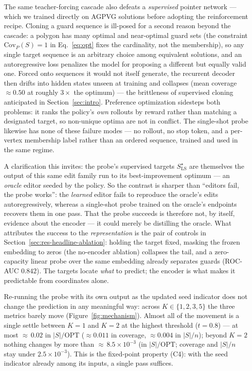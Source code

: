 \documentclass[preprint,10pt]{elsarticle}
\newcommand{\Covf}[1]{\mathrm{Cov}_P(#1)}
\newcommand{\OPT}{\mathrm{OPT}}
\begin{document}
The same teacher-forcing cascade also defeats a \emph{supervised} pointer network --- which we trained directly on AGPVG solutions before adopting the reinforcement recipe. Cloning a guard sequence is ill-posed for a second reason beyond the cascade: a polygon has many optimal and near-optimal guard sets (the constraint $\Covf{S}=1$ in Eq.~\eqref{eq:opt} fixes the cardinality, not the membership), so any single target sequence is an arbitrary choice among equivalent solutions, and an autoregressive loss penalizes the model for proposing a different but equally valid one. Forced onto sequences it would not itself generate, the recurrent decoder then drifts into hidden states unseen at training and collapses (mean coverage $\approx 0.50$ at roughly $3\times$ the optimum) --- the brittleness of supervised cloning anticipated in Section~\ref{sec:intro}. Preference optimization sidesteps both problems: it ranks the policy's \emph{own} rollouts by reward rather than matching a designated target, so non-unique optima are not in conflict. The single-shot probe likewise has none of these failure modes --- no rollout, no stop token, and a per-vertex membership label rather than an ordered sequence, trained and used in the same regime.

A clarification this invites: the probe's supervised targets $S^\star_{\mathrm{LS}}$ are themselves the output of this same edit family run to its best-improvement optimum --- an \emph{oracle} editor seeded by the policy. So the contrast is sharper than ``editors fail, the probe works'': the \emph{learned} editor fails to reproduce the oracle's edits autoregressively, whereas a single-shot probe trained on the oracle's endpoints recovers them in one pass. That the probe succeeds is therefore not, by itself, evidence about the encoder --- it could merely be distilling the oracle. What attributes the success to the \emph{representation} is the pair of controls in Section~\ref{sec:res-headline-ablation}: holding the target fixed, masking the frozen embedding to zeros (the no-encoder ablation) collapses the tail, and a zero-capacity linear probe over the same embedding already separates guards (ROC-AUC $0.842$). The targets locate \emph{what} to predict; the encoder is what makes it predictable from coordinates alone.

Re-running the probe with its own output as the updated seed indicator does not change the prediction in any meaningful way: across $K \in \{1, 2, 3, 5\}$ the three metrics barely move (Figure~\ref{fig:mechanism}). Almost all of the movement is a single settle between $K = 1$ and $K = 2$ at the highest threshold ($t = 0.8$) --- at most ${\approx}\,0.02$ in $|S|/\OPT$ ($\approx 0.011$ in coverage, $\approx 0.004$ in $|S|/n$); beyond $K = 2$ nothing changes by more than ${\approx}\,8.5 \times 10^{-3}$ (in $|S|/\OPT$; coverage and $|S|/n$ stay under $2.5 \times 10^{-3}$). This is the fixed-point property (C4): with the seed indicator already among its inputs, a single pass suffices.
\end{document}
